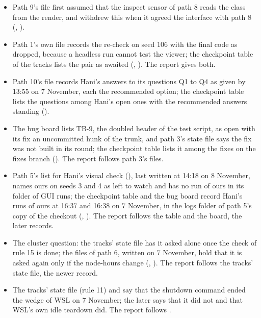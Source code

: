 \begin{itemize}
  , , and the files of paths 6, 8, 9 and 10) and 13:25, the
  time of Go's relay, in a few (the files of paths 3, 7 and 10). The report gives no
  time for the rule.
  \item Path 9's file first assumed that the inspect sensor of path 8 reads the class
  from the render, and withdrew this when it agreed the interface with path 8
  (, ).
  \item Path 1's own file records the re-check on seed 106 with the final code as
  dropped, because a headless run cannot test the viewer; the checkpoint table of the
  tracks lists the pair as awaited (, ). The
  report gives both.
  \item Path 10's file records Hani's answers to its questions Q1 to Q4 as given by
  13:55 on 7 November, each the recommended option; the checkpoint table lists the
  questions among Hani's open ones with the recommended answers standing ().
  \item The bug board lists TB-9, the doubled header of the test script, as open with
  its fix an uncommitted hunk of the trunk, and path 3's state file says the fix was not built in its round; the checkpoint table lists it among the fixes
  on the fixes branch (). The report follows path 3's files.
  \item Path 5's list for Hani's visual check (), last written
  at 14:18 on 8 November, names ours on seeds 3 and 4 as left to watch and has no run
  of ours in its folder of GUI runs; the checkpoint table and the bug board record
  Hani's runs of ours at 16:37 and 16:38 on 7 November, in the logs folder of path 5's
  copy of the checkout (, ). The report follows
  the table and the board, the later records.
  \item The cluster question: the tracks' state file has it asked alone once the check of
  rule 15 is done; the files of path 6, written on 7 November, hold that it is asked
  again only if the node-hours change (, ). The
  report follows the tracks' state file, the newer record.
  \item The tracks' state file (rule 11) and  say that the shutdown command ended
  the wedge of WSL on 7 November; the later  says that it did not and that WSL's
  own idle teardown did. The report follows .
\end{itemize}
